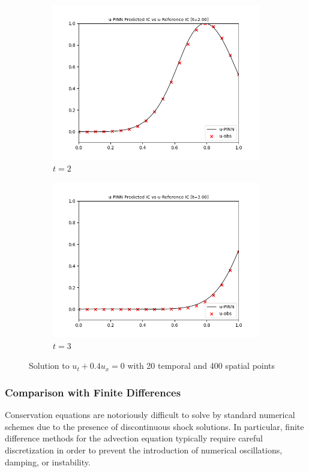 \documentclass[letterpaper,11pt]{article}
\begin{document}
\begin{figure}[h]
\begin{subfigure}{0.45\textwidth}
            \includegraphics*[width=\textwidth]{advection_forward_t2.00.png}
            \caption{$t = 2$}
        \end{subfigure}
        \hfill
        \begin{subfigure}{0.45\textwidth}
            \includegraphics*[width=\textwidth]{advection_forward_t3.00.png}
            \caption{$t = 3$}
        \end{subfigure}
        \caption{Solution to $u_t + 0.4 u_x = 0$ with 20 temporal and 400 spatial points}
    \end{figure}

    \subsubsection*{Comparison with Finite Differences}
    Conservation equations are notoriously difficult to solve by standard numerical schemes due to the presence of
    discontinuous shock solutions. In particular, finite difference methods for the advection equation typically require
    careful discretization in order to prevent the introduction of numerical oscillations, damping, or instability.
    
\end{document}
